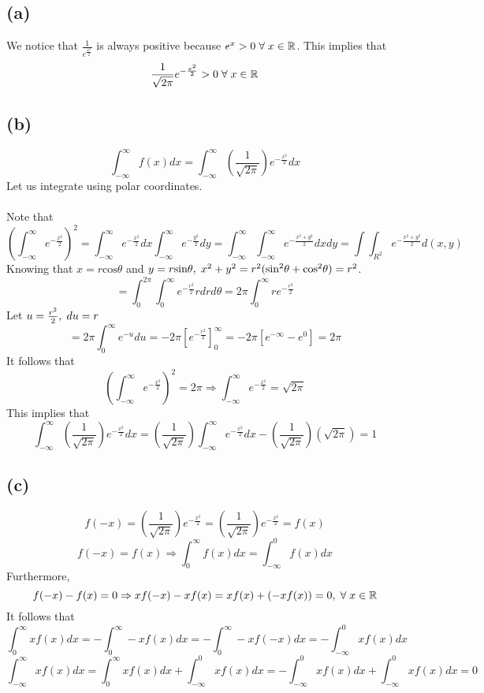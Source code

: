 \documentclass[11pt]{article}
\begin{document}
\subsection*{(a)}
We notice that $\frac{1}{e^{\frac{x^2}{2}}}$ is always positive because $e^x>0\hspace{1mm}\forall\hspace{1mm}x\in\mathbb{R}$. This implies that
\[\frac{1}{\sqrt{2\pi}}e^{-\frac{x^2}{2}}>0\hspace{1mm}\forall\hspace{1mm}x\in\mathbb{R}\]
\subsection*{(b)}
\[\int_{-\infty}^{\infty}f(x)dx=\int_{-\infty}^{\infty}\left(\frac{1}{\sqrt{2\pi}}\right)e^{-\frac{x^2}{2}}dx\]
Let us integrate using polar coordinates. \\ \\
Note that
\[\left(\int_{-\infty}^{\infty}e^{-\frac{x^2}{2}}\right)^2=\int_{-\infty}^{\infty}e^{-\frac{x^2}{2}}dx\int_{-\infty}^{\infty}e^{-\frac{y^2}{2}}dy=\int_{-\infty}^{\infty}\int_{-\infty}^{\infty}e^{-\frac{x^2+y^2}{2}}dxdy=\int\int_{R^2}e^{-\frac{x^2+y^2}{2}}d(x,y)\]
Knowing that $x=r\text{cos}\theta$ and $y=r\text{sin}\theta,\hspace{1mm}x^2+y^2=r^2(\text{sin}^2\theta+\text{cos}^2\theta)=r^2$.
\[=\int_0^{2\pi}\int_0^{\infty}e^{-\frac{r^2}{2}}rdrd\theta=2\pi\int_0^{\infty}re^{-\frac{r^2}{2}}\]
Let $u=\frac{r^2}{2},\hspace{1mm}du=r$
\[=2\pi\int_0^{\infty}e^{-u}du=-2\pi\left[e^{-\frac{r^2}{2}}\right]_0^{\infty}=-2\pi\left[e^{-\infty}-e^0\right]=2\pi\]
It follows that 
\[\left(\int_{-\infty}^{\infty}e^{-\frac{x^2}{2}}\right)^2=2\pi\Rightarrow\int_{-\infty}^{\infty}e^{-\frac{x^2}{2}}=\sqrt{2\pi}\]
This implies that
\[\int_{-\infty}^{\infty}\left(\frac{1}{\sqrt{2\pi}}\right)e^{-\frac{x^2}{2}}dx=\left(\frac{1}{\sqrt{2\pi}}\right)\int_{-\infty}^{\infty}e^{-\frac{x^2}{2}}dx-\left(\frac{1}{\sqrt{2\pi}}\right)\left(\sqrt{2\pi}\right)=1\]
\subsection*{(c)}
\[f(-x)=\left(\frac{1}{\sqrt{2\pi}}\right)e^{-\frac{x^2}{2}}=\left(\frac{1}{\sqrt{2\pi}}\right)e^{-\frac{x^2}{2}}=f(x)\]
\[f(-x)=f(x)\Rightarrow\int_0^{\infty}f(x)dx=\int_{-\infty}^0f(x)dx\]
Furthermore,
\[f(-x)-f(x)=0\Rightarrow xf(-x)-xf(x)=xf(x)+(-xf(x))=0,\hspace{1mm}\forall\hspace{1mm}x\in\mathbb{R}\]
It follows that
\[\int_0^{\infty}xf(x)dx=-\int_0^{\infty}-xf(x)dx=-\int_0^{\infty}-xf(-x)dx=-\int_{-\infty}^0xf(x)dx\]
\[\int_{-\infty}^{\infty}xf(x)dx=\int_0^{\infty}xf(x)dx+\int_{-\infty}^0xf(x)dx=-\int_{-\infty}^0xf(x)dx+\int_{-\infty}^0xf(x)dx=0\]
\end{document}
